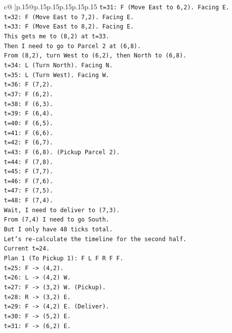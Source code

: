 \documentclass{article}
\begin{document}
{\begin{supertabular}{c@{$\;$}|p{.15\linewidth}@{}p{.15\linewidth}p{.15\linewidth}p{.15\linewidth}p{.15\linewidth}p{.15\linewidth}}
{{{\texttt{t=31: F (Move East to 6,2). Facing E.} \\
\texttt{t=32: F (Move East to 7,2). Facing E.} \\
\texttt{t=33: F (Move East to 8,2). Facing E.} \\
\texttt{This gets me to (8,2) at t=33.} \\
\texttt{Then I need to go to Parcel 2 at (6,8).} \\
\texttt{From (8,2), turn West to (6,2), then North to (6,8).} \\
\texttt{t=34: L (Turn North). Facing N.} \\
\texttt{t=35: L (Turn West). Facing W.} \\
\texttt{t=36: F (7,2).} \\
\texttt{t=37: F (6,2).} \\
\texttt{t=38: F (6,3).} \\
\texttt{t=39: F (6,4).} \\
\texttt{t=40: F (6,5).} \\
\texttt{t=41: F (6,6).} \\
\texttt{t=42: F (6,7).} \\
\texttt{t=43: F (6,8). (Pickup Parcel 2).} \\
\texttt{t=44: F (7,8).} \\
\texttt{t=45: F (7,7).} \\
\texttt{t=46: F (7,6).} \\
\texttt{t=47: F (7,5).} \\
\texttt{t=48: F (7,4).} \\
\texttt{Wait, I need to deliver to (7,3).} \\
\texttt{From (7,4) I need to go South.} \\
\texttt{But I only have 48 ticks total.} \\
\texttt{Let's re{-}calculate the timeline for the second half.} \\
\texttt{Current t=24.} \\
\texttt{Plan 1 (To Pickup 1): F L F R F F.} \\
\texttt{t=25: F {-}> (4,2).} \\
\texttt{t=26: L {-}> (4,2) W.} \\
\texttt{t=27: F {-}> (3,2) W. (Pickup).} \\
\texttt{t=28: R {-}> (3,2) E.} \\
\texttt{t=29: F {-}> (4,2) E. (Deliver).} \\
\texttt{t=30: F {-}> (5,2) E.} \\
\texttt{t=31: F {-}> (6,2) E.} \\
}}}
\end{supertabular}}
\end{document}
